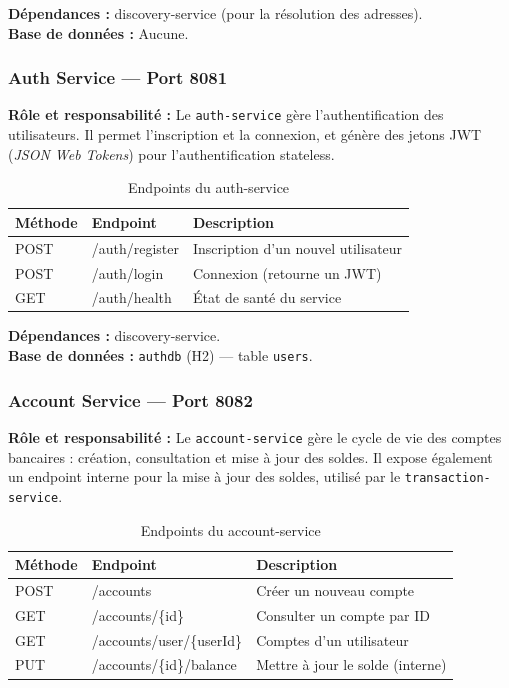 \documentclass[12pt,a4paper]{article}
\begin{document}
\textbf{Dépendances :} discovery-service (pour la résolution des adresses).\\
\textbf{Base de données :} Aucune.

\subsubsection{Auth Service --- Port 8081}

\textbf{Rôle et responsabilité :} Le \texttt{auth-service} gère l'authentification des utilisateurs. Il permet l'inscription et la connexion, et génère des jetons JWT (\textit{JSON Web Tokens}) pour l'authentification stateless.

\begin{table}[H]
\centering
\caption{Endpoints du auth-service}
\begin{tabularx}{\textwidth}{|l|l|X|}
\hline
\textbf{Méthode} & \textbf{Endpoint} & \textbf{Description} \\
\hline
POST & /auth/register & Inscription d'un nouvel utilisateur \\
\hline
POST & /auth/login & Connexion (retourne un JWT) \\
\hline
GET & /auth/health & État de santé du service \\
\hline
\end{tabularx}
\end{table}

\textbf{Dépendances :} discovery-service.\\
\textbf{Base de données :} \texttt{authdb} (H2) --- table \texttt{users}.

\subsubsection{Account Service --- Port 8082}

\textbf{Rôle et responsabilité :} Le \texttt{account-service} gère le cycle de vie des comptes bancaires : création, consultation et mise à jour des soldes. Il expose également un endpoint interne pour la mise à jour des soldes, utilisé par le \texttt{transaction-service}.

\begin{table}[H]
\centering
\caption{Endpoints du account-service}
\begin{tabularx}{\textwidth}{|l|l|X|}
\hline
\textbf{Méthode} & \textbf{Endpoint} & \textbf{Description} \\
\hline
POST & /accounts & Créer un nouveau compte \\
\hline
GET & /accounts/\{id\} & Consulter un compte par ID \\
\hline
GET & /accounts/user/\{userId\} & Comptes d'un utilisateur \\
\hline
PUT & /accounts/\{id\}/balance & Mettre à jour le solde (interne) \\
\hline
\end{tabularx}
\end{table}
\end{document}
